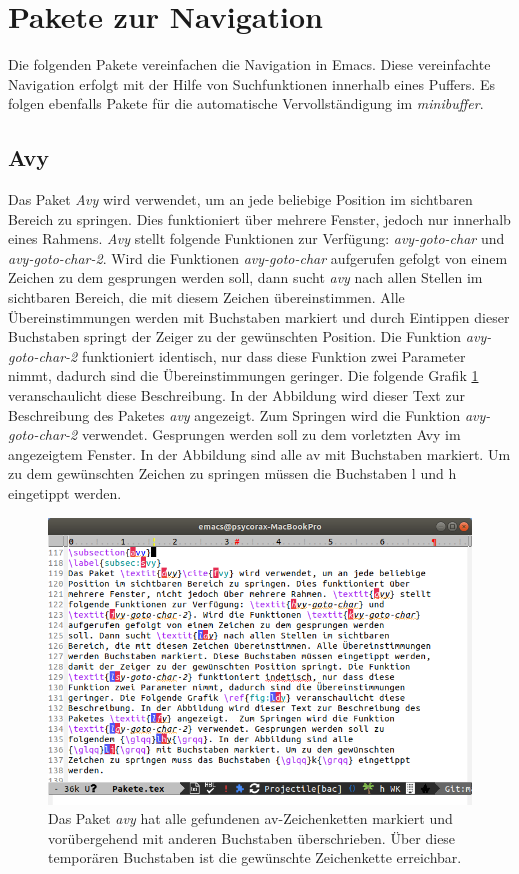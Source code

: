 \section{Pakete zur Navigation}
\label{sec:navigation}
Die folgenden Pakete vereinfachen die Navigation in Emacs. Diese
vereinfachte Navigation erfolgt mit der Hilfe von Suchfunktionen
innerhalb eines Puffers. Es folgen ebenfalls Pakete für die
automatische Vervollständigung im \textit{minibuffer}.

\subsection{Avy}
\label{subsec:avy}
Das Paket \textit{Avy} wird verwendet, um an jede beliebige Position
im sichtbaren Bereich zu springen. Dies funktioniert über mehrere
Fenster, jedoch nur innerhalb eines Rahmens. \textit{Avy} stellt
folgende Funktionen zur Verfügung: \textit{avy-goto-char} und
\textit{avy-goto-char-2}. Wird die Funktionen \textit{avy-goto-char}
aufgerufen gefolgt von einem Zeichen zu dem gesprungen werden soll,
dann sucht \textit{avy} nach allen Stellen im sichtbaren Bereich, die
mit diesem Zeichen übereinstimmen. Alle Übereinstimmungen werden mit
Buchstaben markiert und durch Eintippen dieser Buchstaben springt der
Zeiger zu der gewünschten Position. Die Funktion
\textit{avy-goto-char-2} funktioniert identisch, nur dass diese
Funktion zwei Parameter nimmt, dadurch sind die Übereinstimmungen
geringer. Die folgende Grafik \ref{fig:avy} veranschaulicht diese
Beschreibung. In der Abbildung wird dieser Text zur Beschreibung des
Paketes \textit{avy} angezeigt.  Zum Springen wird die Funktion
\textit{avy-goto-char-2} verwendet. Gesprungen werden soll zu dem
vorletzten {\glqq}Avy{\grqq} im angezeigtem Fenster. In der Abbildung
sind alle {\glqq}av{\grqq} mit Buchstaben markiert. Um zu dem
gewünschten Zeichen zu springen müssen die Buchstaben {\glqq}l{\grqq}
und {\glqq}h{\grqq} eingetippt werden. \cite{Avy}

\begin{figure}[h]
  \centering
  \includegraphics[width=.95\textwidth]{./images/Pakete/avy.png}
  \caption{\label{fig:avy} Das Paket \textit{avy} hat alle gefundenen
    {\glqq}av{\grqq}-Zeichenketten markiert und vorübergehend mit
    anderen Buchstaben überschrieben. Über diese temporären Buchstaben
    ist die gewünschte Zeichenkette erreichbar.}
\end{figure}

